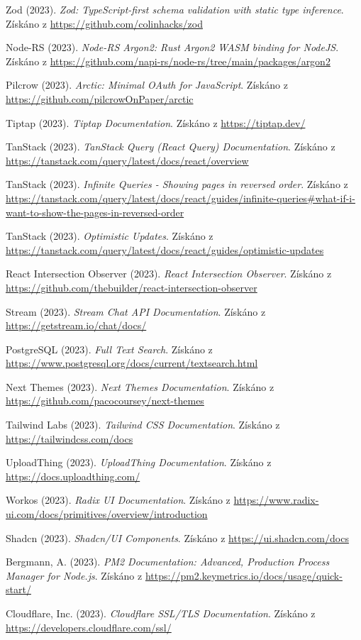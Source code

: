 \documentclass[12pt]{article}
\begin{document}
\begin{thebibliography}{99}
 Zod (2023). \textit{Zod: TypeScript-first schema validation with static type inference}. Získáno z \url{https://github.com/colinhacks/zod}

 Node-RS (2023). \textit{Node-RS Argon2: Rust Argon2 WASM binding for NodeJS}. Získáno z \url{https://github.com/napi-rs/node-rs/tree/main/packages/argon2}

 Pilcrow (2023). \textit{Arctic: Minimal OAuth for JavaScript}. Získáno z \url{https://github.com/pilcrowOnPaper/arctic}

 Tiptap (2023). \textit{Tiptap Documentation}. Získáno z \url{https://tiptap.dev/}

 TanStack (2023). \textit{TanStack Query (React Query) Documentation}. Získáno z \url{https://tanstack.com/query/latest/docs/react/overview}

 TanStack (2023). \textit{Infinite Queries - Showing pages in reversed order}. Získáno z \url{https://tanstack.com/query/latest/docs/react/guides/infinite-queries#what-if-i-want-to-show-the-pages-in-reversed-order}

 TanStack (2023). \textit{Optimistic Updates}. Získáno z \url{https://tanstack.com/query/latest/docs/react/guides/optimistic-updates}

 React Intersection Observer (2023). \textit{React Intersection Observer}. Získáno z \url{https://github.com/thebuilder/react-intersection-observer}

 Stream (2023). \textit{Stream Chat API Documentation}. Získáno z \url{https://getstream.io/chat/docs/}

 PostgreSQL (2023). \textit{Full Text Search}. Získáno z \url{https://www.postgresql.org/docs/current/textsearch.html}

 Next Themes (2023). \textit{Next Themes Documentation}. Získáno z \url{https://github.com/pacocoursey/next-themes}

 Tailwind Labs (2023). \textit{Tailwind CSS Documentation}. Získáno z \url{https://tailwindcss.com/docs}

 UploadThing (2023). \textit{UploadThing Documentation}. Získáno z \url{https://docs.uploadthing.com/}

 Workos (2023). \textit{Radix UI Documentation}. Získáno z \url{https://www.radix-ui.com/docs/primitives/overview/introduction}

 Shadcn (2023). \textit{Shadcn/UI Components}. Získáno z \url{https://ui.shadcn.com/docs}

 Bergmann, A. (2023). \textit{PM2 Documentation: Advanced, Production Process Manager for Node.js}. Získáno z \url{https://pm2.keymetrics.io/docs/usage/quick-start/}

 Cloudflare, Inc. (2023). \textit{Cloudflare SSL/TLS Documentation}. Získáno z \url{https://developers.cloudflare.com/ssl/}

\end{thebibliography}
\end{document}
